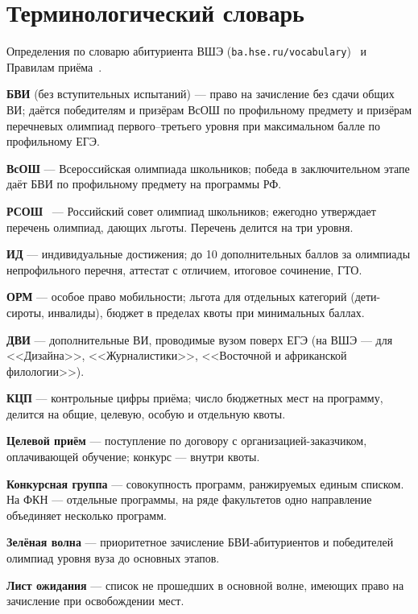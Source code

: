 \documentclass[a4paper,12pt]{extarticle}
\begin{document}
\newpage
\printbibliography[heading=bibintoc]

\newpage
\appendix
\section{Терминологический словарь}

Определения по словарю абитуриента ВШЭ (\texttt{ba.hse.ru/vocabulary})~\cite{hsebachelor} и Правилам приёма~\cite{hsebachelor}.

\textbf{БВИ} (без вступительных испытаний) --- право на зачисление без сдачи общих ВИ; даётся победителям и призёрам ВсОШ по профильному предмету и призёрам перечневых олимпиад первого--третьего уровня при максимальном балле по профильному ЕГЭ.

\textbf{ВсОШ} --- Всероссийская олимпиада школьников; победа в заключительном этапе даёт БВИ по профильному предмету на программы РФ.

\textbf{РСОШ}~\cite{rsosh} --- Российский совет олимпиад школьников; ежегодно утверждает перечень олимпиад, дающих льготы. Перечень делится на три уровня.

\textbf{ИД} --- индивидуальные достижения; до 10 дополнительных баллов за олимпиады непрофильного перечня, аттестат с отличием, итоговое сочинение, ГТО.

\textbf{ОРМ} --- особое право мобильности; льгота для отдельных категорий (дети-сироты, инвалиды), бюджет в пределах квоты при минимальных баллах.

\textbf{ДВИ} --- дополнительные ВИ, проводимые вузом поверх ЕГЭ (на ВШЭ --- для <<Дизайна>>, <<Журналистики>>, <<Восточной и африканской филологии>>).

\textbf{КЦП} --- контрольные цифры приёма; число бюджетных мест на программу, делится на общие, целевую, особую и отдельную квоты.

\textbf{Целевой приём} --- поступление по договору с организацией-заказчиком, оплачивающей обучение; конкурс --- внутри квоты.

\textbf{Конкурсная группа} --- совокупность программ, ранжируемых единым списком. На ФКН --- отдельные программы, на ряде факультетов одно направление объединяет несколько программ.

\textbf{Зелёная волна} --- приоритетное зачисление БВИ-абитуриентов и победителей олимпиад уровня вуза до основных этапов.

\textbf{Лист ожидания} --- список не прошедших в основной волне, имеющих право на зачисление при освобождении мест.
\end{document}
